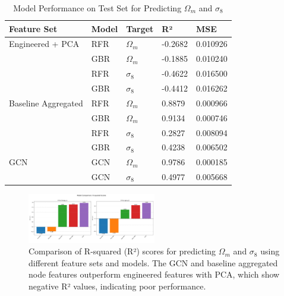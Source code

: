 \documentclass[twocolumn]{aastex631}
\begin{document}
\begin{table}[h!]
\centering
\caption{Model Performance on Test Set for Predicting $\Omega_m$ and $\sigma_8$}
\begin{tabular}{|l|l|l|l|l|}
\hline
Feature Set             & Model & Target    & R²      & MSE        \\ \hline
Engineered + PCA    & RFR   & $\Omega_m$  & -0.2682 & 0.010926   \\ \hline
                        & GBR   & $\Omega_m$  & -0.1885 & 0.010240   \\ \hline
                        & RFR   & $\sigma_8$  & -0.4622 & 0.016500   \\ \hline
                        & GBR   & $\sigma_8$  & -0.4412 & 0.016262   \\ \hline
Baseline Aggregated & RFR   & $\Omega_m$  & 0.8879  & 0.000966   \\ \hline
                        & GBR   & $\Omega_m$  & 0.9134  & 0.000746   \\ \hline
                        & RFR   & $\sigma_8$  & 0.2827  & 0.008094   \\ \hline
                        & GBR   & $\sigma_8$  & 0.4238  & 0.006502   \\ \hline
GCN                     & GCN   & $\Omega_m$  & 0.9786  & 0.000185   \\ \hline
                        & GCN   & $\sigma_8$  & 0.4977  & 0.005668   \\ \hline
\end{tabular}
\label{tab:model_performance}
\end{table}

\begin{figure}[h!]
    \centering
    \includegraphics[width=0.5\textwidth]{../input_files/plots/model_performance_r2_11_20250527-135752.png}
    \caption{Comparison of R-squared (R²) scores for predicting $\Omega_m$ and $\sigma_8$ using different feature sets and models. The GCN and baseline aggregated node features outperform engineered features with PCA, which show negative R² values, indicating poor performance.}
    \label{fig:model_performance_r2}
\end{figure}
\end{document}
